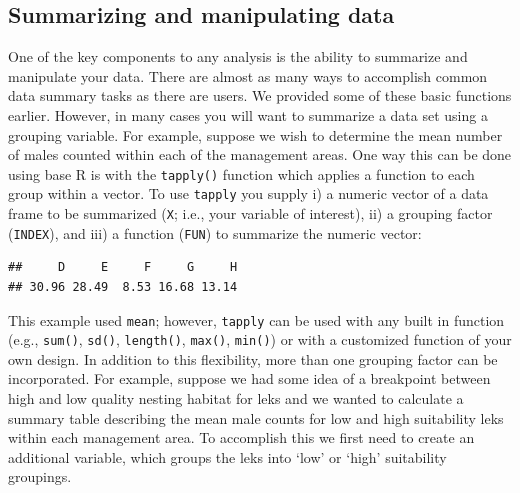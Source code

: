 \documentclass[
]{book}
\newenvironment{Shaded}{\begin{snugshade}}{\end{snugshade}}
\newcommand{\AttributeTok}[1]{\textcolor[rgb]{0.13,0.29,0.53}{#1}}
\newcommand{\FunctionTok}[1]{\textcolor[rgb]{0.13,0.29,0.53}{\textbf{#1}}}
\newcommand{\NormalTok}[1]{#1}
\newcommand{\SpecialCharTok}[1]{\textcolor[rgb]{0.81,0.36,0.00}{\textbf{#1}}}
\begin{document}
\hypertarget{summarizing-and-manipulating-data}{%
\subsection{Summarizing and manipulating data}\label{summarizing-and-manipulating-data}}

One of the key components to any analysis is the ability to summarize and manipulate your data. There are almost as many ways to accomplish common data summary tasks as there are users. We provided some of these basic functions earlier. However, in many cases you will want to summarize a data set using a grouping variable. For example, suppose we wish to determine the mean number of males counted within each of the management areas. One way this can be done using base R is with the \texttt{tapply()} function which applies a function to each group within a vector. To use \texttt{tapply} you supply i) a numeric vector of a data frame to be summarized (\texttt{X}; i.e., your variable of interest), ii) a grouping factor (\texttt{INDEX}), and iii) a function (\texttt{FUN}) to summarize the numeric vector:

\begin{Shaded}
\end{Shaded}

\begin{verbatim}
##     D     E     F     G     H 
## 30.96 28.49  8.53 16.68 13.14
\end{verbatim}

This example used \texttt{mean}; however, \texttt{tapply} can be used with any built in function (e.g., \texttt{sum()}, \texttt{sd()}, \texttt{length()}, \texttt{max()}, \texttt{min()}) or with a customized function of your own design. In addition to this flexibility, more than one grouping factor can be incorporated. For example, suppose we had some idea of a breakpoint between high and low quality nesting habitat for leks and we wanted to calculate a summary table describing the mean male counts for low and high suitability leks within each management area. To accomplish this we first need to create an additional variable, which groups the leks into `low' or `high' suitability groupings.
\end{document}
